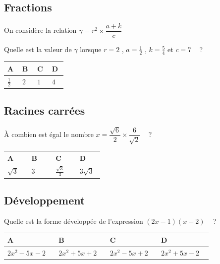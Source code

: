 \documentclass[oneside,12pt]{article}
\begin{document}
\subsection{Fractions}
On considère la relation $\gamma=r^2\times\dfrac{a+k}{c}$

Quelle est la valeur de $\gamma$ lorsque $r=2$ , $a=\frac{1}{2}$ , $k=\frac{5}{4}$ et $c=7$ ~ ?

\begin{center}
	\renewcommand{\arraystretch}{1.5}
	\begin{tabular}{| P{0.22\linewidth} | P{0.22\linewidth} | P{0.22\linewidth} | P{0.22\linewidth} |} \hline
	A & B & C & D \\ \hline
	$\frac{1}{2}$ & $2$ & $1$ & $4$ \\ \hline
	\end{tabular}
\end{center}



\subsection{Racines carrées}
À combien est égal le nombre $x=\dfrac{\sqrt{6}}{2}\times\dfrac{6}{\sqrt{2}}$ ~ ?

\begin{center}
	\renewcommand{\arraystretch}{1.5}
	\begin{tabular}{| P{0.22\linewidth} | P{0.22\linewidth} | P{0.22\linewidth} | P{0.22\linewidth} |} \hline
	A & B & C & D \\ \hline
	\rule{0pt}{6.5mm}
	$\sqrt{3}$ & $3$ & $\frac{\sqrt{3}}{3}$ & $3\sqrt{3}$ \\[1pt] \hline
	\end{tabular}
\end{center}



\subsection{Développement}
Quelle est la forme développée de l'expression $(2x-1)(x-2)$ ~ ?

\begin{center}
	\renewcommand{\arraystretch}{1.5}
	\begin{tabular}{| P{0.22\linewidth} | P{0.22\linewidth} | P{0.22\linewidth} | P{0.22\linewidth} |} \hline
	A & B & C & D \\ \hline
	\rule{0pt}{6.5mm}
	$2x^2-5x-2$ & $2x^2+5x+2$ & $2x^2-5x+2$ & $2x^2+5x-2$ \\[1pt] \hline
	\end{tabular}
\end{center}
\end{document}
